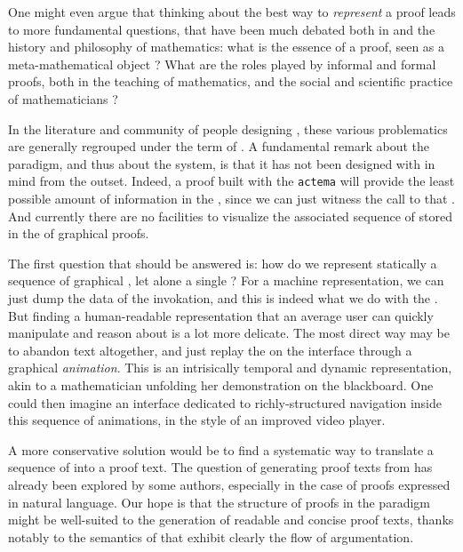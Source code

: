 \begin{digression}
One might even argue that thinking about the best way to \emph{represent} a
proof leads to more fundamental questions, that have been much debated both in
 and the history and philosophy of mathematics: what is the
essence of a proof, seen as a meta-mathematical object
\cite{strasburger-problem-2019}? What are the roles played by informal and
formal proofs, both in the teaching of mathematics, and the social and
scientific practice of mathematicians \cite{bartzia:hal-04087080}?
\end{digression}

In the literature and community of people designing , these
various problematics are generally regrouped under the term of . A fundamental remark about the  paradigm, and thus about the
 system, is that it has not been designed with  in mind from the outset. Indeed, a proof built with the
\texttt{actema}  will provide the least possible amount of information in
the , since we can just witness the call to that . And
currently there are no facilities to visualize the associated sequence of
 stored in the  of graphical proofs.

The first question that should be answered is: how do we represent statically a
sequence of graphical , let alone a single ? For a machine
representation, we can just dump the data of the  invokation, and this is
indeed what we do with the . But finding a human-readable
representation that an average user can quickly manipulate and reason about is a
lot more delicate. The most direct way may be to abandon text altogether, and
just replay the  on the interface through a graphical \emph{animation}.
This is an intrisically temporal and dynamic representation, akin to a
mathematician unfolding her demonstration on the blackboard. One could then
imagine an interface dedicated to richly-structured navigation inside this
sequence of animations, in the style of an improved video player.

A more conservative solution would be to find a systematic way to translate a
sequence of  into a proof text. The question of generating
 proof texts from   has already
been explored by some authors, especially in the case of proofs expressed in
natural language. Our hope is that the structure
of proofs in the  paradigm might be well-suited to the generation of
readable and concise proof texts, thanks notably to the 
semantics of   that exhibit clearly the flow of argumentation.

